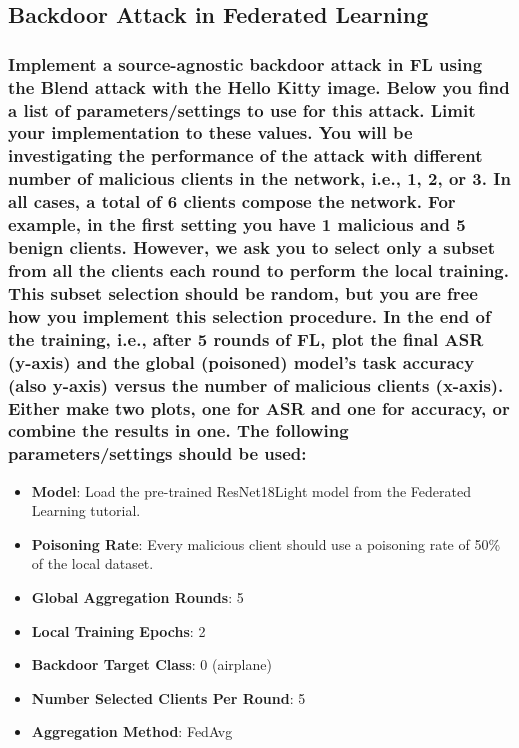 \documentclass{article}
\begin{document}

\subsection{Backdoor Attack in Federated Learning}
\subsubsection{Implement a source-agnostic backdoor attack in FL using the
Blend attack with the Hello Kitty image. Below you find a list of parameters/settings to use for this attack. Limit your implementation to these values.
You will be investigating the performance of the attack with different number of
malicious clients in the network, i.e., 1, 2, or 3. In all cases, a total of 6 clients
compose the network. For example, in the first setting you have 1 malicious
and 5 benign clients. However, we ask you to select only a subset from all the
clients each round to perform the local training. This subset selection should be
random, but you are free how you implement this selection procedure. In the
end of the training, i.e., after 5 rounds of FL, plot the final ASR (y-axis) and
the global (poisoned) model’s task accuracy (also y-axis) versus the number of
malicious clients (x-axis). Either make two plots, one for ASR and one for accuracy, or combine the results in one. The following parameters/settings should
be used:}
\begin{itemize}
    \item \textbf{Model}: Load the pre-trained ResNet18Light model from the Federated
    Learning tutorial.
    \item \textbf{Poisoning Rate}: Every malicious client should use a poisoning rate of
    50\% of the local dataset.
    \item \textbf{Global Aggregation Rounds}: 5
    \item \textbf{Local Training Epochs}: 2
    \item \textbf{Backdoor Target Class}: 0 (airplane)
    \item \textbf{Number Selected Clients Per Round}: 5
    \item \textbf{Aggregation Method}: FedAvg
\end{itemize}
\end{document}
